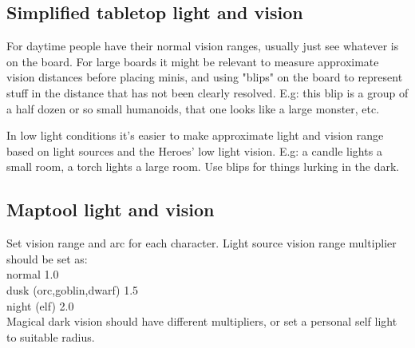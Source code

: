 \subsection*{Simplified tabletop light and vision}
For daytime people have their normal vision ranges, usually just see whatever is on the board. For large boards it might be relevant to measure approximate vision distances before placing minis, and using "blips" on the board to represent stuff in the distance that has not been clearly resolved. E.g: this blip is a group of a half dozen or so small humanoids, that one looks like a large monster, etc.

In low light conditions it's easier to make approximate light and vision range based on light sources and the Heroes' low light vision. E.g: a candle lights a small room, a torch lights a large room. Use blips for things lurking in the dark.


\subsection*{Maptool light and vision}
Set vision range and arc for each character.
Light source vision range multiplier should be set as:\\
normal 1.0\\
dusk (orc,goblin,dwarf) 1.5\\
night (elf) 2.0\\
Magical dark vision should have different multipliers, or set a personal self light to suitable radius.






















